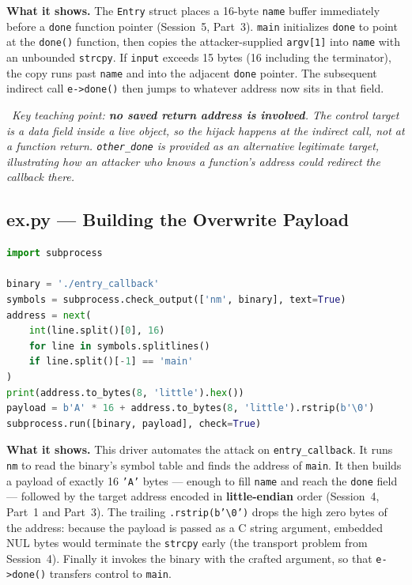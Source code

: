\documentclass[hidelinks]{article}
\newcommand{\callout}[1]{\par\smallskip\noindent{\color{capri}$\blacktriangleright$}\ \textit{#1}\par\smallskip}
\begin{document}
\textbf{What it shows.} The \texttt{Entry} struct places a 16-byte \texttt{name} buffer immediately before a \texttt{done} function pointer (Session~5, Part~3). \texttt{main} initializes \texttt{done} to point at the \texttt{done()} function, then copies the attacker-supplied \texttt{argv[1]} into \texttt{name} with an unbounded \texttt{strcpy}. If \texttt{input} exceeds 15 bytes (16 including the terminator), the copy runs past \texttt{name} and into the adjacent \texttt{done} pointer. The subsequent indirect call \texttt{e->done()} then jumps to whatever address now sits in that field.

\callout{Key teaching point: \textbf{no saved return address is involved}. The control target is a data field inside a live object, so the hijack happens at the indirect call, not at a function return. \texttt{other\_done} is provided as an alternative legitimate target, illustrating how an attacker who knows a function's address could redirect the callback there.}

\subsection{ex.py --- Building the Overwrite Payload}

\begin{lstlisting}[language=Python]
import subprocess

binary = './entry_callback'
symbols = subprocess.check_output(['nm', binary], text=True)
address = next(
    int(line.split()[0], 16)
    for line in symbols.splitlines()
    if line.split()[-1] == 'main'
)
print(address.to_bytes(8, 'little').hex())
payload = b'A' * 16 + address.to_bytes(8, 'little').rstrip(b'\0')
subprocess.run([binary, payload], check=True)
\end{lstlisting}

\textbf{What it shows.} This driver automates the attack on \texttt{entry\_callback}. It runs \texttt{nm} to read the binary's symbol table and finds the address of \texttt{main}. It then builds a payload of exactly 16 \texttt{'A'} bytes --- enough to fill \texttt{name} and reach the \texttt{done} field --- followed by the target address encoded in \textbf{little-endian} order (Session~4, Part~1 and Part~3). The trailing \texttt{.rstrip(b'\textbackslash 0')} drops the high zero bytes of the address: because the payload is passed as a C string argument, embedded NUL bytes would terminate the \texttt{strcpy} early (the transport problem from Session~4). Finally it invokes the binary with the crafted argument, so that \texttt{e->done()} transfers control to \texttt{main}.
\end{document}
